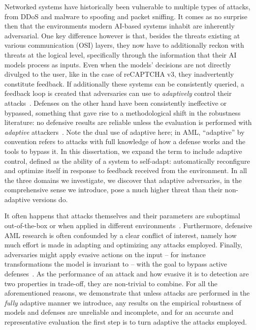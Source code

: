 Networked systems have historically been vulnerable to multiple types of attacks, from DDoS and malware to spoofing and packet sniffing.
It comes as no surprise then that the environments modern AI-based systems inhabit are inherently adversarial.
One key difference however is that, besides the threats existing at various communication (\gls{OSI}) layers, they now have to additionally reckon with threats at the logical level, specifically through the information that their \gls{AI} models process as inputs.
Even when the models' decisions are not directly divulged to the user, like in the case of reCAPTCHA v3, they inadvertently constitute feedback.
If additionally these systems can be consistently queried, a feedback loop is created that adversaries can use to \textit{adaptively} control their attacks~\cite{astrom1995adaptive}.
Defenses on the other hand have been consistently ineffective or bypassed, something that gave rise to a methodological shift in the robustness literature: no defensive results are reliable unless the evaluation is performed with \textit{adaptive} attackers~\cite{madry2017towards}.
Note the dual use of adaptive here; in \gls{AML}, “adaptive” by convention refers to attacks with full knowledge of how a defense works and the tools to bypass it.
In this dissertation, we expand the term to include adaptive control, defined as the ability of a system to self-adapt: automatically reconfigure and optimize itself in response to feedback received from the environment.
In all the three domains we investigate, we discover that adaptive adversaries, in the comprehensive sense we introduce, pose a much higher threat than their non-adaptive versions do.

It often happens that attacks themselves and their parameters are suboptimal out-of-the-box or when applied in different environments~\cite{croce2020reliable}.
Furthermore, defensive \gls{AML} research is often confounded by a clear conflict of interest, namely how much effort is made in adapting and optimizing any attacks employed.
Finally, adversaries might apply evasive actions on the input -- for instance transformations the model is invariant to -- with the goal to bypass active defenses~\cite{chen2020stateful,li2022blacklight}.
As the performance of an attack and how evasive it is to detection are two properties in trade-off, they are non-trivial to combine.
For all the aforementioned reasons, we demonstrate that unless attacks are performed in the \textit{fully} adaptive manner we introduce, any results on the empirical robustness of models and defenses are unreliable and incomplete, and for an accurate and representative evaluation the first step is to turn adaptive the attacks employed.


